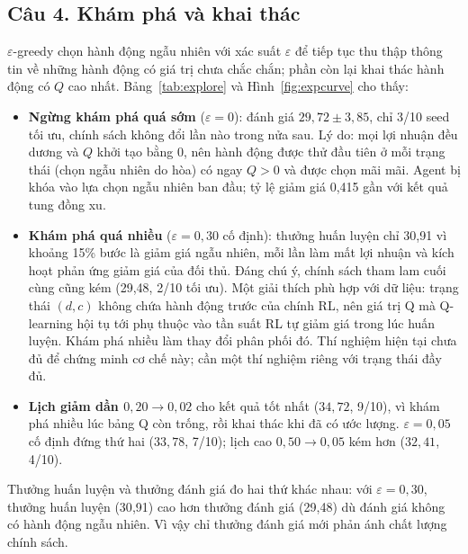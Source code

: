 \documentclass[12pt,a4paper]{report}
\begin{document}
\subsection*{Câu 4. Khám phá và khai thác}
$\varepsilon$-greedy chọn hành động ngẫu nhiên với xác suất $\varepsilon$ để tiếp
tục thu thập thông tin về những hành động có giá trị chưa chắc chắn; phần còn lại
khai thác hành động có $Q$ cao nhất. Bảng~\ref{tab:explore} và
Hình~\ref{fig:expcurve} cho thấy:
\begin{itemize}
\item \textbf{Ngừng khám phá quá sớm} ($\varepsilon=0$): đánh giá $29{,}72\pm3{,}85$,
  chỉ 3/10 seed tối ưu, chính sách không đổi lần nào trong nửa sau. Lý do: mọi
  lợi nhuận đều dương và $Q$ khởi tạo bằng 0, nên hành động được thử đầu tiên ở mỗi
  trạng thái (chọn ngẫu nhiên do hòa) có ngay $Q>0$ và được chọn mãi mãi. Agent bị
  khóa vào lựa chọn ngẫu nhiên ban đầu; tỷ lệ giảm giá 0{,}415 gần với kết quả tung
  đồng xu.
\item \textbf{Khám phá quá nhiều} ($\varepsilon=0{,}30$ cố định): thưởng huấn luyện
  chỉ 30{,}91 vì khoảng 15\% bước là giảm giá ngẫu nhiên, mỗi lần làm mất lợi nhuận
  và kích hoạt phản ứng giảm giá của đối thủ. Đáng chú ý, chính sách tham lam cuối
  cùng cũng kém (29{,}48, 2/10 tối ưu). Một giải thích phù hợp với dữ liệu: trạng
  thái $(d,c)$ không chứa hành động trước của chính RL, nên giá trị Q mà Q-learning
  hội tụ tới phụ thuộc vào tần suất RL tự giảm giá trong lúc huấn luyện. Khám phá
  nhiều làm thay đổi phân phối đó. Thí nghiệm hiện tại chưa đủ để chứng minh cơ chế
  này; cần một thí nghiệm riêng với trạng thái đầy đủ.
\item \textbf{Lịch giảm dần $0{,}20\to0{,}02$} cho kết quả tốt nhất ($34{,}72$,
  9/10), vì khám phá nhiều lúc bảng Q còn trống, rồi khai thác khi đã có ước lượng.
  $\varepsilon=0{,}05$ cố định đứng thứ hai ($33{,}78$, 7/10); lịch cao
  $0{,}50\to0{,}05$ kém hơn ($32{,}41$, 4/10).
\end{itemize}
Thưởng huấn luyện và thưởng đánh giá đo hai thứ khác nhau: với $\varepsilon=0{,}30$,
thưởng huấn luyện (30{,}91) cao hơn thưởng đánh giá (29{,}48) dù đánh giá không có
hành động ngẫu nhiên. Vì vậy chỉ thưởng đánh giá mới phản ánh chất lượng chính sách.

\end{document}
